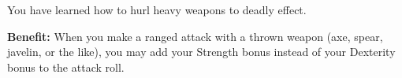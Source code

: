 
You have learned how to hurl heavy weapons to deadly effect.

\textbf{Benefit:} When you make a ranged attack with a thrown weapon (axe, spear, javelin, or the like), you may add your Strength bonus instead of your Dexterity bonus to the attack roll.
